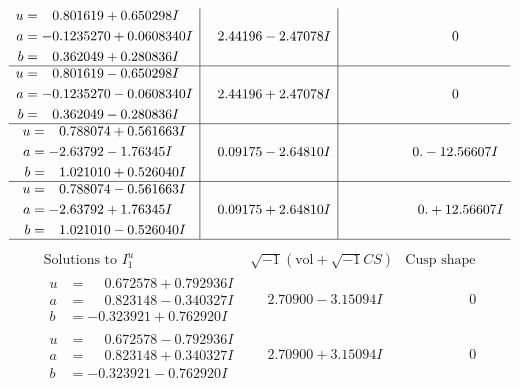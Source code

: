 \documentclass[1p]{elsarticle_modified}
\theoremstyle{definition}
\newcommand{\I}{\sqrt{-1}}
\begin{document}
$$\begin{array}{c|c|c}
\begin{aligned}
u &= \phantom{-}0.801619 + 0.650298 I \\
a &= -0.1235270 + 0.0608340 I \\
b &= \phantom{-}0.362049 + 0.280836 I\end{aligned}
 & \phantom{-}2.44196 - 2.47078 I & \phantom{-0.000000 } 0 \\ \hline\begin{aligned}
u &= \phantom{-}0.801619 - 0.650298 I \\
a &= -0.1235270 - 0.0608340 I \\
b &= \phantom{-}0.362049 - 0.280836 I\end{aligned}
 & \phantom{-}2.44196 + 2.47078 I & \phantom{-0.000000 } 0 \\ \hline\begin{aligned}
u &= \phantom{-}0.788074 + 0.561663 I \\
a &= -2.63792 - 1.76345 I \\
b &= \phantom{-}1.021010 + 0.526040 I\end{aligned}
 & \phantom{-}0.09175 - 2.64810 I & \phantom{-0.000000 } 0. - 12.56607 I \\ \hline\begin{aligned}
u &= \phantom{-}0.788074 - 0.561663 I \\
a &= -2.63792 + 1.76345 I \\
b &= \phantom{-}1.021010 - 0.526040 I\end{aligned}
 & \phantom{-}0.09175 + 2.64810 I & \phantom{-0.000000 -}0. + 12.56607 I\\
 \hline 
 \end{array}$$\newpage$$\begin{array}{c|c|c}  
\text{Solutions to }I^u_{1}& \I (\text{vol} + \sqrt{-1}CS) & \text{Cusp shape}\\
 \hline 
\begin{aligned}
u &= \phantom{-}0.672578 + 0.792936 I \\
a &= \phantom{-}0.823148 - 0.340327 I \\
b &= -0.323921 + 0.762920 I\end{aligned}
 & \phantom{-}2.70900 - 3.15094 I & \phantom{-0.000000 } 0 \\ \hline\begin{aligned}
u &= \phantom{-}0.672578 - 0.792936 I \\
a &= \phantom{-}0.823148 + 0.340327 I \\
b &= -0.323921 - 0.762920 I\end{aligned}
 & \phantom{-}2.70900 + 3.15094 I & \phantom{-0.000000 } 0 \\ \hline\begin{aligned}

\end{aligned}
\end{array}$$
\end{document}
